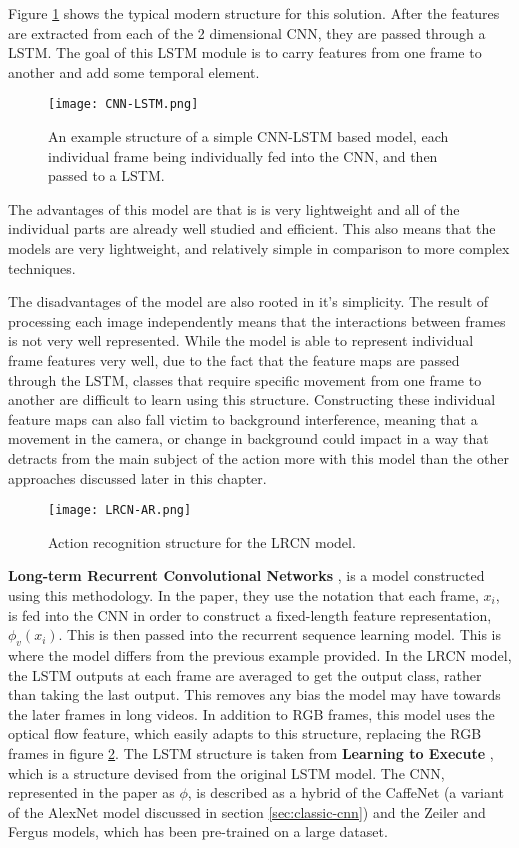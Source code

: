Figure \ref{fig:cnn-lstm} shows the typical modern structure for this solution. After the features are extracted from each of the 2 dimensional CNN, they are passed through a LSTM. The goal of this LSTM module is to carry features from one frame to another and add some temporal element.

\begin{figure}[ht]
	\texttt{[image: CNN-LSTM.png]}
	\centering
	\caption{An example structure of a simple CNN-LSTM based model, each individual frame being individually fed into the CNN, and then passed to a LSTM.}
	\label{fig:cnn-lstm}
\end{figure}

The advantages of this model are that is is very lightweight and all of the individual parts are already well studied and efficient. This also means that the models are very lightweight, and relatively simple in comparison to more complex techniques.

The disadvantages of the model are also rooted in it's simplicity. The result of processing each image independently means that the interactions between frames is not very well represented. While the model is able to represent individual frame features very well, due to the fact that the feature maps are passed through the LSTM, classes that require specific movement from one frame to another are difficult to learn using this structure. Constructing these individual feature maps can also fall victim to background interference, meaning that a movement in the camera, or change in background could impact in a way that detracts from the main subject of the action more with this model than the other approaches discussed later in this chapter.

\begin{figure}[ht]
	\texttt{[image: LRCN-AR.png]}
	\centering
	\caption{Action recognition structure for the LRCN model. \cite{LRCNS}}
	\label{fig:lrcn-ar}
\end{figure}

\textbf{Long-term Recurrent Convolutional Networks} \cite{LRCNS}, is a model constructed using this methodology. In the paper, they use the notation that each frame, $x_{i}$, is fed into the CNN in order to construct a fixed-length feature representation, $\phi_{v}(x_{i})$. This is then passed into the recurrent sequence learning model. This is where the model differs from the previous example provided. In the LRCN model, the LSTM outputs at each frame are averaged to get the output class, rather than taking the last output. This removes any bias the model may have towards the later frames in long videos. In addition to RGB frames, this model uses the optical flow feature, which easily adapts to this structure, replacing the RGB frames in figure \ref{fig:lrcn-ar}. The LSTM structure is taken from \textbf{Learning to Execute} \cite{LSTM-2015}, which is a structure devised from the original LSTM model. The CNN, represented in the paper as $\phi$, is described as a hybrid of the CaffeNet \cite{caffenet} (a variant of the AlexNet \cite{alexnet} model discussed in section \ref{sec:classic-cnn}) and the Zeiler and Fergus \cite{zeilerfergus} models, which has been pre-trained on a large dataset.

